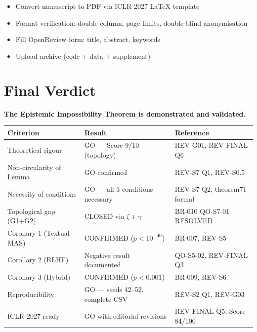 \documentclass[11pt,a4paper]{article}
\theoremstyle{plain}
\begin{document}
\begin{itemize}[leftmargin=*]
\item Convert manuscript to PDF via ICLR 2027 \LaTeX{} template
\item Format verification: double column, page limits, double-blind anonymisation
\item Fill OpenReview form: title, abstract, keywords
\item Upload archive (code + data + supplement)
\end{itemize}

\section{Final Verdict}

\begin{mdframed}[linecolor=green!50!black,backgroundcolor=green!5,linewidth=2pt]
\centering\large\bfseries
\checkmark\quad The Epistemic Impossibility Theorem is demonstrated and validated.\quad\checkmark
\end{mdframed}

\vspace{0.5cm}

\begin{center}
\begin{tabular}{lll}
\toprule
Criterion & Result & Reference \\
\midrule
Theoretical rigour & GO --- Score 9/10 (topology) & REV-G01, REV-FINAL Q6 \\
Non-circularity of Lemma & GO confirmed & REV-S7 Q1, REV-S0.5 \\
Necessity of conditions & GO --- all 3 conditions necessary & REV-S7 Q2, theorem71 formal \\
Topological gap (G1+G2) & CLOSED via $\zeta + \gamma$ & BR-010 QO-S7-01 RESOLVED \\
Corollary 1 (Textual MAS) & CONFIRMED ($p < 10^{-40}$) & BR-007, REV-S5 \\
Corollary 2 (RLHF) & Negative result documented & QO-S5-02, REV-FINAL Q3 \\
Corollary 3 (Hybrid) & CONFIRMED ($p < 0.001$) & BR-009, REV-S6 \\
Reproducibility & GO --- seeds 42--52, complete CSV & REV-S2 Q1, REV-G03 \\
ICLR 2027 ready & GO with editorial revisions & REV-FINAL Q5, Score 84/100 \\
\bottomrule
\end{tabular}
\end{center}
\end{document}
